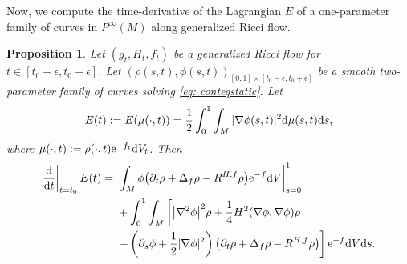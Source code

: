 \documentclass[pdftex]{sigma}
\numberwithin{equation}{section}
\newtheorem{prop}[thm]{Proposition}
 { \theoremstyle{definition}
\newtheorem{defn}[thm]{Definition}
\newtheorem{Note}[thm]{Note}
\newtheorem{Example}[thm]{Example}
\newtheorem{rmk}[thm]{Remark} }
\newcommand{\del}{\partial}
\newcommand{\eps}{\epsilon}
\newcommand{\N}{\nabla}
\begin{document}
Now, we compute the time-derivative of the Lagrangian $E$ of a one-parameter family of curves in $P^\infty(M)$ along generalized Ricci flow.

\begin{prop}\label{prop: energy}
Let $(g_t,H_t,f_t)$ be a generalized Ricci flow for $t\in[t_0-\eps,t_0+\eps]$.
Let $(\rho(s,t),\phi(s,t))_{[0,1]\times [t_0-\eps,t_0+\eps]}$ be a smooth two-parameter family of curves solving \eqref{eq: conteqstatic}.
Let
\begin{align*}
 E(t):=E(\mu(\cdot,t))=\frac12\int_0^1\int_M |\N\phi(s,t)|^2 {\rm d}\mu(s,t) {\rm d}s,
\end{align*}
where $\mu(\cdot,t):=\rho(\cdot,t) {\rm e}^{-f_t} {\rm d}V_t$.
Then
\begin{align*}
\left. \frac{{\rm d}}{{\rm d}t}\right|_{t=t_0}E(t)
={}&\left. \int_M \phi\big(\del_t\rho+\Delta_f \rho-R^{H,f}\rho\big) {\rm e}^{-f} {\rm d}V\right|_{s=0}^1\\
& +\int_0^1\int_M\left[ \big|\N^2\phi\big|^2\rho+\frac14 H^2(\N\phi,\N\phi)\rho\right.\\
&\left.-\left(\del_s\phi+\frac12|\N\phi|^2\right)\big(\del_t\rho+\Delta_f\rho-R^{H,f}\rho\big) \right] {\rm e}^{-f} {\rm d}V {\rm d}s.
\end{align*}
\end{prop}
\end{document}
